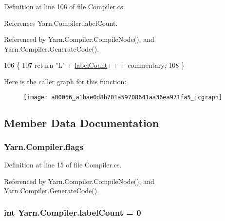 Definition at line 106 of file Compiler.\-cs.



References Yarn.\-Compiler.\-label\-Count.



Referenced by Yarn.\-Compiler.\-Compile\-Node(), and Yarn.\-Compiler.\-Generate\-Code().


\begin{DoxyCode}
106                                                        \{
107             \textcolor{keywordflow}{return} \textcolor{stringliteral}{"L"} + \hyperlink{a00056_a87758397eba2e84cda8e0d6c40656f3f}{labelCount}++ + commentary;
108         \}
\end{DoxyCode}


Here is the caller graph for this function\-:
\nopagebreak
\begin{figure}[H]
\begin{center}
\leavevmode
\texttt{[image: a00056\_a1bae0d8b701a59708641aa36ea971fa5\_icgraph]}
\end{center}
\end{figure}




\subsection{Member Data Documentation}
\hypertarget{a00056_a541022d89bcf9bc8f794eb6d6b438d08}{
\subsubsection[{flags}]{ Yarn.\-Compiler.\-flags\hspace{0.3cm}{\ttfamily [private]}}}\label{a00056_a541022d89bcf9bc8f794eb6d6b438d08}


Definition at line 15 of file Compiler.\-cs.



Referenced by Yarn.\-Compiler.\-Compile\-Node(), and Yarn.\-Compiler.\-Generate\-Code().

\hypertarget{a00056_a87758397eba2e84cda8e0d6c40656f3f}{
\subsubsection[{label\-Count}]{\setlength{\rightskip}{0pt plus 5cm}int Yarn.\-Compiler.\-label\-Count = 0\hspace{0.3cm}{\ttfamily [private]}}}\label{a00056_a87758397eba2e84cda8e0d6c40656f3f}


